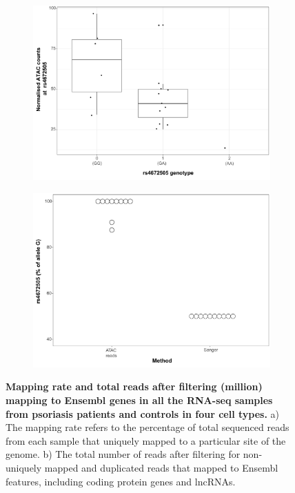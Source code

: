 \begin{figure}[htbp]
\centering
\begin{subfigure}{0.5\textwidth}
\centering
\includegraphics[width=\textwidth]{./Results2/pdfs/ATAC_caQTL_CD8_final}
\caption{\textbf{}}
\end{subfigure}%
\begin{subfigure}{0.5\textwidth}
\centering
\includegraphics[width=\textwidth]{./Results2/pdfs/chr2p15_rs4672505_allelic_imbalance_CD8_final}
\caption{\textbf{}}
\end{subfigure}
\caption[Mapping rate and total reads after filtering (million) mapping to Ensembl genes in all the RNA-seq samples from psoriasis patients and controls in four cell types.]{\textbf{Mapping rate and total reads after filtering (million) mapping to Ensembl genes in all the RNA-seq samples from psoriasis patients and controls in four cell types.} a) The mapping rate refers to the percentage of total sequenced reads from each sample that uniquely mapped to a particular site of the genome. b) The total number of reads after filtering for non-uniquely mapped and duplicated reads that mapped to Ensembl features, including coding protein genes and lncRNAs.}
\label{figure:ATAC_PS_CTL_caQTL_and_allelic_imbalance}
\end{figure} 






